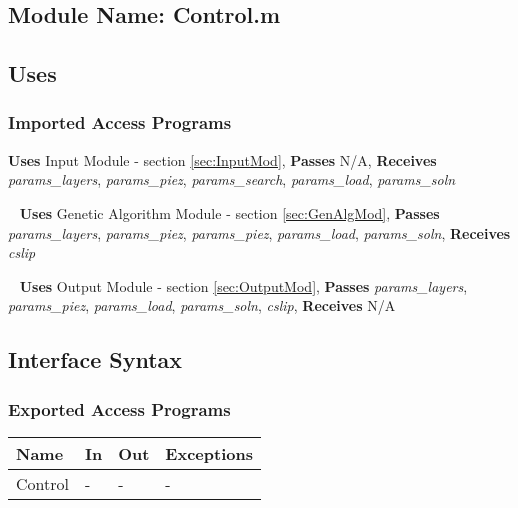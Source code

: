 \documentclass[12pt, titlepage]{article}
\begin{document}
\subsection{Module Name: Control.m}

\subsection{Uses}

\subsubsection{Imported Access Programs}

\noindent
\textbf{Uses} Input Module - section \ref{sec:InputMod},
\textbf{Passes} N/A, \textbf{Receives} \textit{params\_layers},
\textit{params\_piez}, \textit{params\_search},
\textit{params\_load}, \textit{params\_soln}

~\newline\noindent
\textbf{Uses} Genetic Algorithm Module - section \ref{sec:GenAlgMod},
\textbf{Passes} \textit{params\_layers}, \textit{params\_piez},
\textit{params\_piez}, \textit{params\_load},
\textit{params\_soln}, \textbf{Receives} \textit{cslip}

~\newline\noindent
\textbf{Uses} Output Module - section \ref{sec:OutputMod},
\textbf{Passes} \textit{params\_layers}, \textit{params\_piez},
\textit{params\_load}, \textit{params\_soln},
\textit{cslip}, \textbf{Receives} N/A

\subsection{Interface Syntax}

\subsubsection{Exported Access Programs}

\begin{center}
\renewcommand*{\arraystretch}{1.5}
\begin{tabular} {|p{}| p{}
    |p{} |p{}|}

  \hline \textbf{Name} & \textbf{In} & \textbf{Out} &
  \textbf{Exceptions} \\ \hline

  Control & - & - & - \\ \hline
\end{tabular}
\end{center}
\end{document}
